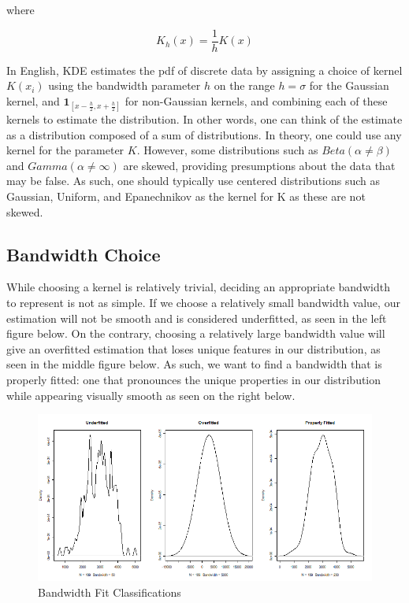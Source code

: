\documentclass{article}
\begin{document}
where

\begin{equation}
    K_h(x) = \frac{1}{h}K(x)
\end{equation}

\newpage

In English, KDE estimates the pdf of discrete data by assigning a choice of kernel $K(x_i)$ using the bandwidth parameter $h$ on the range $h = \sigma$ for the Gaussian kernel, and $\mathbf{1}_{[x-\frac{h}{2}, x+\frac{h}{2}]}$ for non-Gaussian kernels, and combining each of these kernels to estimate the distribution. In other words, one can think of the estimate as a distribution composed of a sum of distributions. In theory, one could use any kernel for the parameter $K$. However, some distributions such as $Beta(\alpha \ne \beta)$ and $Gamma(\alpha \ne \infty)$ are skewed, providing presumptions about the data that may be false. As such, one should typically use centered distributions such as Gaussian, Uniform, and Epanechnikov 
as the kernel for K as these are not skewed.

\subsection{Bandwidth Choice}

While choosing a kernel is relatively trivial, deciding an appropriate bandwidth to represent is not as simple. If we choose a relatively small bandwidth value, our estimation will not be smooth and is considered underfitted, as seen in the left figure below. On the contrary, choosing a relatively large bandwidth value will give an overfitted estimation that loses unique features in our distribution, as seen in the middle figure below. As such, we want to find a bandwidth that is properly fitted: one that pronounces the unique properties in our distribution while appearing visually smooth as seen on the right below.

\begin{figure}[h]
    \centering
    \includegraphics[scale = 0.33]{volume/KDE_FitComparison.png}
    \caption{Bandwidth Fit Classifications}
    \label{fig:fit-classification}
\end{figure}
\end{document}
